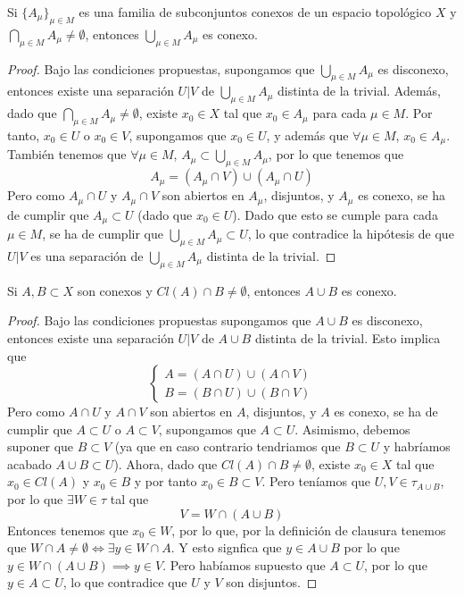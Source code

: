 \begin{proposición}
    Si $\{A_\mu\}_{\mu \in M}$ es una familia de subconjuntos conexos de un espacio topológico $X$ y $\bigcap_{\mu \in M} A_\mu \neq \emptyset$, entonces $\bigcup_{\mu \in M} A_\mu$ es conexo.
\end{proposición}
\begin{proof}
    Bajo las condiciones propuestas, supongamos que $\bigcup_{\mu \in M} A_\mu$ es disconexo, entonces existe una separación $U|V$ de $\bigcup_{\mu \in M} A_\mu$ distinta de la trivial. Además, dado que $\bigcap_{\mu \in M} A_\mu \neq \emptyset$, existe $x_0 \in X$ tal que $x_0 \in A_\mu$ para cada $\mu \in M$. Por tanto, $x_0 \in U$ o $x_0 \in V$, supongamos que $x_0 \in U$, y además que $\forall \mu \in M$, $x_0 \in A_\mu$. \\
    También tenemos que $\forall \mu \in M$, $A_{\mu} \subset \bigcup_{\mu \in M} A_\mu$, por lo que tenemos que 
    $$A_{\mu} = (A_{\mu} \cap V) \cup (A_{\mu} \cap U)$$
    Pero como $A_{\mu} \cap U$ y $A_{\mu} \cap V$ son abiertos en $A_{\mu}$, disjuntos, y $A_{\mu}$ es conexo, se ha de cumplir que $A_{\mu} \subset U$ (dado que $x_0 \in U$). Dado que esto se cumple para cada $\mu \in M$, se ha de cumplir que $\bigcup_{\mu \in M} A_\mu \subset U$, lo que contradice la hipótesis de que $U|V$ es una separación de $\bigcup_{\mu \in M} A_\mu$ distinta de la trivial.
\end{proof}
\begin{proposición}
    Si $A, B \subset X$ son conexos y $Cl(A) \cap B \neq \emptyset$, entonces $A \cup B$ es conexo.
\end{proposición}
\begin{proof}
    Bajo las condiciones propuestas supongamos que $A \cup B$ es disconexo, entonces existe una separación $U|V$ de $A \cup B$ distinta de la trivial. Esto implica que 
    $$\begin{cases} A = (A \cap U) \cup (A \cap V) \\ B = (B \cap U) \cup (B \cap V) \end{cases}$$
    Pero como $A \cap U$ y $A \cap V$ son abiertos en $A$, disjuntos, y $A$ es conexo, se ha de cumplir que $A \subset U$ o $A \subset V$, supongamos que $A \subset U$. Asimismo, debemos suponer que $B \subset V$ (ya que en caso contrario tendriamos que $B \subset U$ y habríamos acabado $A \cup B \subset U$). Ahora, dado que $Cl(A) \cap B \neq \emptyset$, existe $x_0 \in X$ tal que $x_0 \in Cl(A)$ y $x_0 \in B$ y por tanto $x_0 \in B \subset V$. Pero teníamos que $U, V \in \tau_{A \cup B}$, por lo que $\exists W \in \tau$ tal que 
    $$V = W \cap (A \cup B)$$
    Entonces tenemos que $x_0 \in W$, por lo que, por la definición de clausura tenemos que $W \cap A \neq \emptyset \iff \exists y \in W \cap A$. Y esto signfica que $y \in A \cup B$ por lo que $y \in W \cap (A \cup B) \implies y \in V$. Pero habíamos supuesto que $A \subset U$, por lo que $y \in A \subset U$, lo que contradice que $U$ y $V$ son disjuntos.
\end{proof}

